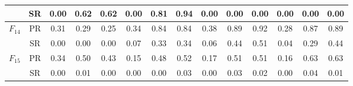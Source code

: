 \begin{table*}[h]
\begin{tabular}{|c|c|ccc|ccc|ccc|ccc|}
    & SR & 0.00 & 0.62 & 0.62 & 0.00 & 0.81 & 0.94 & 0.00 & 0.00 & 0.00 & 0.00 & 0.00 & 0.00 \\
    \hline
    \multirow{2}{*}{$F_{14}$} & PR & 0.31 & 0.29 & 0.25 & 0.34 & 0.84 & 0.84 & 0.38 & 0.89 & 0.92 & 0.28 & 0.87 & 0.89 \\
    & SR & 0.00 & 0.00 & 0.00 & 0.07 & 0.33 & 0.34 & 0.06 & 0.44 & 0.51 & 0.04 & 0.29 & 0.44 \\
    \hline
    \multirow{2}{*}{$F_{15}$} & PR & 0.34 & 0.50 & 0.43 & 0.15 & 0.48 & 0.52 & 0.17 & 0.51 & 0.51 & 0.16 & 0.63 & 0.63 \\
    & SR & 0.00 & 0.01 & 0.00 & 0.00 & 0.00 & 0.03 & 0.00 & 0.03 & 0.02 & 0.00 & 0.04 & 0.01 \\
    \hline
  \end{tabular}
  \label{table:pickfunctions}
\end{table*}
